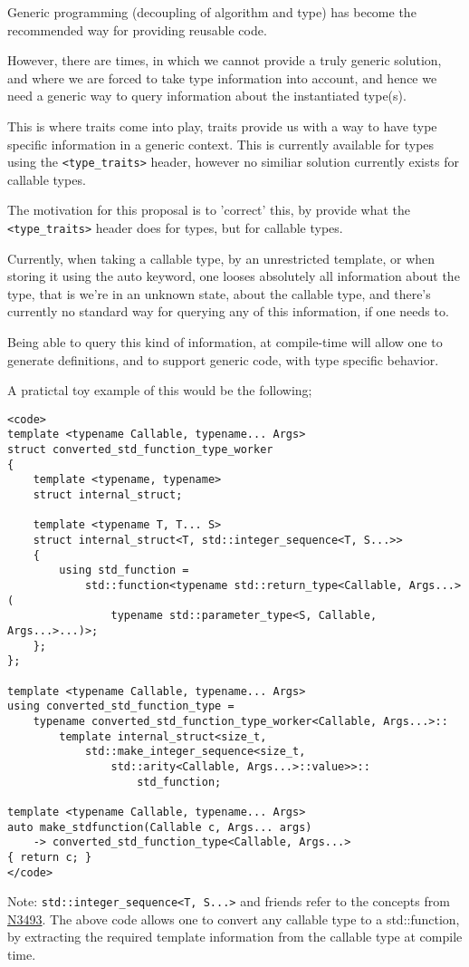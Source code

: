 Generic programming (decoupling of algorithm and type) has become the
recommended way for providing reusable code.

However, there are times, in which we cannot provide a truly generic solution,
and where we are forced to take type information into account, and hence we
need a generic way to query information about the instantiated type(s).

This is where traits come into play, traits provide us with a way to have type
specific information in a generic context. This is currently available for types
using the \verb|<type_traits>| header, however no similiar solution currently
exists for callable types.

The motivation for this proposal is to 'correct' this, by provide what the 
\verb|<type_traits>| header does for types, but for callable types.

Currently, when taking a callable type, by an unrestricted template, or when
storing it using the auto keyword, one looses absolutely all information about
the type, that is we're in an unknown state, about the callable type, and
there's currently no standard way for querying any of this information, if one
needs to.

Being able to query this kind of information, at compile-time will allow one
to generate definitions, and to support generic code, with type specific
behavior.

A pratictal toy example of this would be the following;
\begin{verbatim}
<code>
template <typename Callable, typename... Args>
struct converted_std_function_type_worker
{
    template <typename, typename>
    struct internal_struct;

    template <typename T, T... S>
    struct internal_struct<T, std::integer_sequence<T, S...>>
    {
        using std_function =
            std::function<typename std::return_type<Callable, Args...>(
                typename std::parameter_type<S, Callable, Args...>...)>;
    };
};

template <typename Callable, typename... Args>
using converted_std_function_type =
    typename converted_std_function_type_worker<Callable, Args...>::
        template internal_struct<size_t,
            std::make_integer_sequence<size_t,
                std::arity<Callable, Args...>::value>>::
                    std_function;

template <typename Callable, typename... Args>
auto make_stdfunction(Callable c, Args... args)
    -> converted_std_function_type<Callable, Args...>
{ return c; }
</code>
\end{verbatim}
Note: \verb|std::integer_sequence<T, S...>| and friends refer to the concepts from
\href{http://www.open-std.org/jtc1/sc22/wg21/docs/papers/2013/n3493.html}{N3493}.
\noindent
The above code allows one to convert any callable type to a std::function, by
extracting the required template information from the callable type at compile time.

